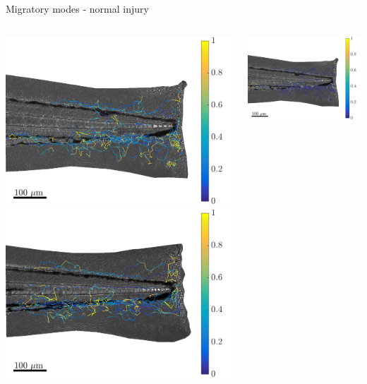 \documentclass[mathserif,11pt]{beamer}
\begin{document}
\begin{frame}{Migratory modes - normal injury}
\begin{columns}
\begin{column}{0.31\textwidth}
		\vspace{-0.2cm}
		\includegraphics[scale=0.19]{Figures/mode2_fish1.png}\vfil
		\vspace{0.2cm}
		\includegraphics[scale=0.19]{Figures/mode2_fish3.png}
	\end{column}
	\begin{column}{0.31\textwidth}
		\vspace{-0.2cm}
		\includegraphics[scale=0.19]{Figures/mode3_fish1.png}\vfil

\end{column}
\end{columns}
\end{frame}
\end{document}
